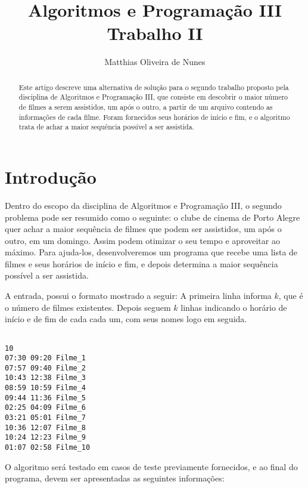 \documentclass[12pt]{article}
\title{Algoritmos e Programação III\\ Trabalho II}
\author{Matthias Oliveira de Nunes}
\begin{document}
\maketitle

\begin{abstract}

Este artigo descreve uma alternativa de solução para o segundo trabalho proposto pela disciplina de Algoritmos e Programação III, que consiste em descobrir o maior número de filmes a serem assistidos, um após o outro, a partir de um arquivo contendo as informações de cada filme. Foram fornecidos seus horários de início e fim, e o algoritmo trata de achar a maior sequência possível a ser assistida.

\end{abstract}

\section{Introdução}

Dentro do escopo da disciplina de Algoritmos e Programação III, o segundo problema pode ser resumido como o seguinte: o clube de cinema de Porto Alegre quer achar a maior sequência de filmes que podem ser assistidos, um após o outro, em um domingo. Assim podem otimizar o seu tempo e aproveitar ao máximo. Para ajuda-los, desenvolveremos um programa que recebe uma lista de filmes e seus horários de início e fim, e depois determina a maior sequência possível a ser assistida.

A entrada, possui o formato mostrado a seguir:  A primeira linha informa $k$, que é o número de filmes existentes. Depois seguem $k$ linhas indicando o horário de início e de fim de cada cada um, com seus nomes logo em seguida.

\vspace{2.0cm}

\begin{lstlisting}

10
07:30 09:20 Filme_1
07:57 09:40 Filme_2
10:43 12:38 Filme_3
08:59 10:59 Filme_4
09:44 11:36 Filme_5
02:25 04:09 Filme_6
03:21 05:01 Filme_7
10:36 12:07 Filme_8
10:24 12:23 Filme_9
01:07 02:58 Filme_10

\end{lstlisting}

\vspace{0.5cm}

O algoritmo será testado em casos de teste previamente fornecidos, e ao final do programa, devem ser apresentadas as seguintes informações:
\end{document}
